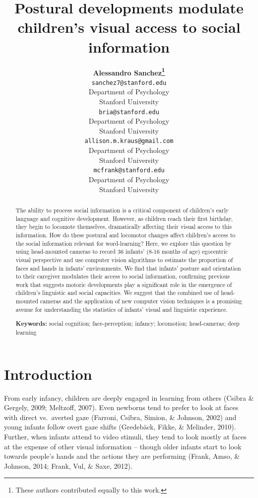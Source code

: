 \documentclass[10pt, letterpaper]{article}
\title{Postural developments modulate children's visual access to social
information}
\author{{\large \bf Alessandro Sanchez\thanks{These authors contributed equally to this work.}} \\ \texttt{sanchez7@stanford.edu} \\ Department of Psychology \\ Stanford University \And {\large \bf Bria Long\footnotemark[1]}  \\ \texttt{bria@stanford.edu} \\ Department of Psychology \\ Stanford University \And {\large \bf Allison M. Kraus} \\ \texttt{allison.m.kraus@gmail.com} \\ Department of Psychology \\ Stanford University \And {\large \bf Michael C. Frank} \\ \texttt{mcfrank@stanford.edu} \\ Department of Psychology \\ Stanford University}
\renewcommand*{\thefootnote}{\fnsymbol{footnote}}
\begin{document}
\maketitle

\begin{abstract}
The ability to process social information is a critical component of
children's early language and cognitive development. However, as
children reach their first birthday, they begin to locomote themselves,
dramatically affecting their visual access to this information. How do
these postural and locomotor changes affect children's access to the
social information relevant for word-learning? Here, we explore this
question by using head-mounted cameras to record 36 infants' (8-16
months of age) egocentric visual perspective and use computer vision
algorithms to estimate the proportion of faces and hands in infants'
environments. We find that infants' posture and orientation to their
caregiver modulates their access to social information, confirming
previous work that suggests motoric developments play a significant role
in the emergence of children's linguistic and social capacities. We
suggest that the combined use of head-mounted cameras and the
application of new computer vision techniques is a promising avenue for
understanding the statistics of infants' visual and linguistic
experience.

\textbf{Keywords:}
social cognition; face-perception; infancy; locomotion; head-cameras;
deep learning
\end{abstract}

\newcommand{\wrapmf}[1]{#1}
\renewcommand*{\thefootnote}{\arabic{footnote}}

\setcounter{footnote}{0}

\section{Introduction}\label{introduction}

From early infancy, children are deeply engaged in learning from others
(Csibra \& Gergely, 2009; Meltzoff, 2007). Even newborns tend to prefer
to look at faces with direct vs.~averted gaze (Farroni, Csibra, Simion,
\& Johnson, 2002) and young infants follow overt gaze shifts
(Gredeb\wrapmf{\"{a}}ck, Fikke, \& Melinder, 2010). Further, when
infants attend to video stimuli, they tend to look mostly at faces at
the expense of other visual information -- though older infants start to
look towards people's hands and the actions they are performing (Frank,
Amso, \& Johnson, 2014; Frank, Vul, \& Saxe, 2012).
\end{document}
